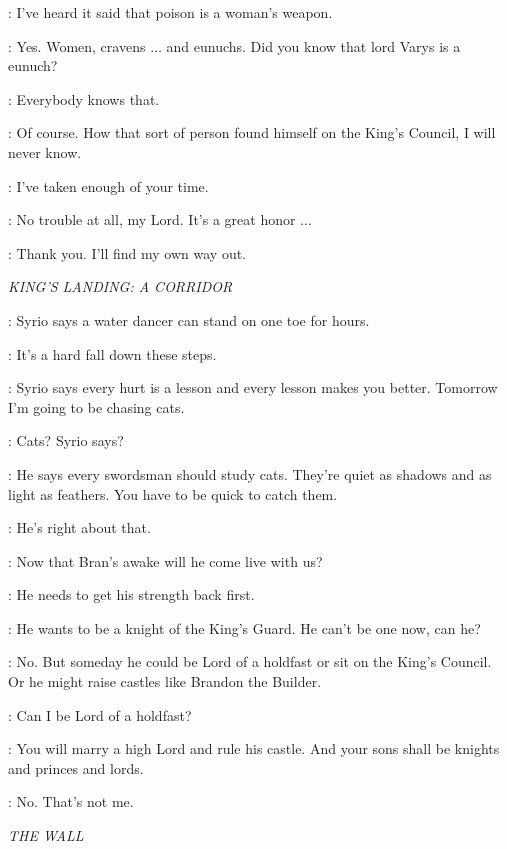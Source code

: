 \NED: I've heard it said that poison is a woman's weapon. 

\PYCELLE: Yes. Women, cravens $\ldots$ and eunuchs. Did you know that lord Varys is a eunuch? 

\NED: Everybody knows that. 

\PYCELLE: Of course. How that sort of person found himself on the King's Council, I will never know. 

\NED: I've taken enough of your time. 

\PYCELLE: No trouble at all, my Lord. It's a great honor $\ldots$ 

\NED: Thank you. I'll find my own way out. 

\scene

\textit{KING'S LANDING: A CORRIDOR}


\ARYA: Syrio says a water dancer can stand on one toe for hours. 

\NED: It's a hard fall down these steps. 

\ARYA: Syrio says every hurt is a lesson and every lesson makes you better. Tomorrow I'm going to be chasing cats. 

\NED: Cats? Syrio says? 

\ARYA: He says every swordsman should study cats. They're quiet as shadows and as light as feathers. You have to be quick to catch them. 

\NED: He's right about that. 

\ARYA: Now that Bran's awake will he come live with us? 

\NED: He needs to get his strength back first. 

\ARYA: He wants to be a knight of the King's Guard. He can't be one now, can he? 

\NED: No. But someday he could be Lord of a holdfast or sit on the King's Council. Or he might raise castles like Brandon the Builder. 

\ARYA: Can I be Lord of a holdfast? 

\NED: You will marry a high Lord and rule his castle. And your sons shall be knights and princes and lords. 

\ARYA: No. That's not me. 

\scene

\textit{THE WALL}


